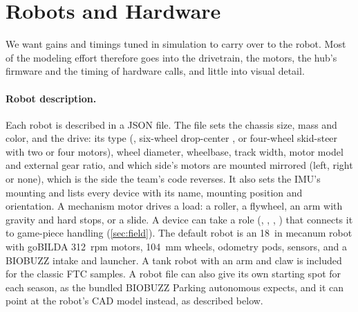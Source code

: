 \documentclass[10pt,twocolumn,letterpaper]{article}
\begin{document}
\section{Robots and Hardware}\label{sec:robots}

We want gains and timings tuned in simulation to carry over to the robot. Most of the modeling effort therefore goes into the drivetrain, the motors, the hub's firmware and the timing of hardware calls, and little into visual detail.

\paragraph{Robot description.} Each robot is described in a JSON file. The file sets the chassis size, mass and color, and the drive: its type (, six-wheel drop-center , or four-wheel skid-steer  with two or four motors), wheel diameter, wheelbase, track width, motor model and external gear ratio, and which side's motors are mounted mirrored (left, right or none), which is the side the team's code reverses. It also sets the IMU's mounting and lists every device with its name, mounting position and orientation. A mechanism motor drives a load: a roller, a flywheel, an arm with gravity and hard stops, or a slide. A device can take a role (, , , ) that connects it to game-piece handling (\cref{sec:field}). The default robot is an 18~in mecanum robot with goBILDA 312~rpm motors, 104~mm wheels, odometry pods, sensors, and a BIOBUZZ intake and launcher. A tank robot with an arm and claw is included for the classic FTC samples. A robot file can also give its own starting spot for each season, as the bundled BIOBUZZ Parking autonomous expects, and it can point at the robot's CAD model instead, as described below.
\end{document}
